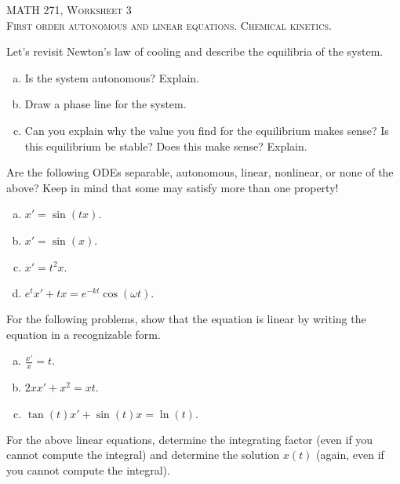 \documentclass[12pt]{article} %
\begin{document}
\begin{center}
   \textsc{\large MATH 271, Worksheet 3}\\
   \textsc{First order autonomous and linear equations. Chemical kinetics.}
\end{center}
\vspace{.5cm}

\begin{problem}
    Let's revisit Newton's law of cooling and describe the equilibria of the system. 
\begin{enumerate}[(a)]
    \item Is the system autonomous? Explain.
    \item Draw a phase line for the system.
    \item Can you explain why the value you find for the equilibrium makes sense? Is this equilibrium be stable? Does this make sense? Explain.
\end{enumerate}
\end{problem}

\begin{problem}
Are the following ODEs separable, autonomous, linear, nonlinear, or none of the above? Keep in mind that some may satisfy more than one property!
    \begin{enumerate}[(a)]
        \item $x' = \sin(tx)$.
        \item $x' = \sin(x)$.
        \item $x' = t^2 x$.
        \item $e^t x' + tx = e^{-k t} \cos(\omega t).$
    \end{enumerate}
\end{problem}

\begin{problem}
For the following problems, show that the equation is linear by writing the equation in a recognizable form.
    \begin{enumerate}[(a)]
        \item $\frac{x'}{x} = t$.
        \item $2xx'+x^2=xt$.
        \item $\tan(t) x' + \sin(t) x = \ln(t).$
    \end{enumerate}
\end{problem}

\begin{problem}
    For the above linear equations, determine the integrating factor (even if you cannot compute the integral) and determine the solution $x(t)$ (again, even if you cannot compute the integral).
\end{problem}
\end{document}
